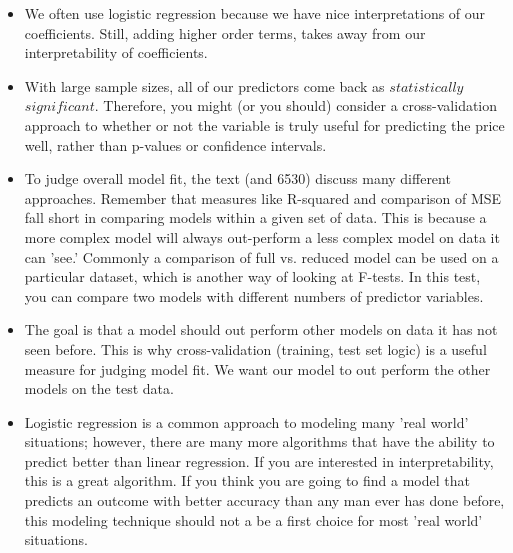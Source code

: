 \documentclass{article}
\begin{document}
\begin{itemize}
\item We often use logistic regression because we have nice interpretations of our coefficients.  Still, adding higher order terms, takes away from our interpretability of coefficients.  

\item With large sample sizes, all of our predictors come back as $statistically$ $significant$.  Therefore, you might (or you should) consider a cross-validation approach to whether or not the variable is truly useful for predicting the price well, rather than p-values or confidence intervals.

\item To judge overall model fit, the text (and 6530) discuss many different approaches.  Remember that measures like R-squared and comparison of MSE fall short in comparing models within a given set of data.  This is because a more complex model will always out-perform a less complex model on data it can 'see.'  Commonly a comparison of full vs. reduced model can be used on a particular dataset, which is another way of looking at F-tests.  In this test, you can compare two models with different numbers of predictor variables.

\item The goal is that a model should out perform other models on data it has not seen before.  This is why cross-validation (training, test set logic) is a useful measure for judging model fit.  We want our model to out perform the other models on the test data.

\item Logistic regression is a common approach to modeling many 'real world' situations; however, there are many more algorithms that have the ability to predict better than linear regression.  If you are interested in interpretability, this is a great algorithm.  If you think you are going to find a model that predicts an outcome with better accuracy than any man ever has done before, this modeling technique should not a be a first choice for most 'real world' situations.
\end{itemize}
\end{document}
